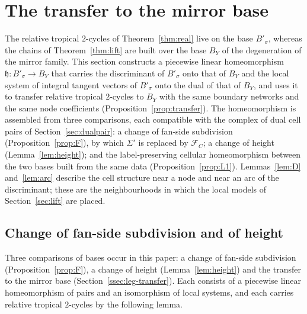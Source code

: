 \section{The transfer to the mirror base}\label{sec:legendre}

The relative tropical $2$-cycles of Theorem~\ref{thm:real} live on the base $B'_\sigma$, whereas the chains of
Theorem~\ref{thm:lift} are built over the base $B_Y$ of the degeneration of the mirror family. This section constructs a
piecewise linear homeomorphism $\mathfrak h\colon B'_\sigma\to B_Y$ that carries the discriminant of $B'_\sigma$ onto that of
$B_Y$ and the local system of integral tangent vectors of $B'_\sigma$ onto the dual of that of $B_Y$, and uses it to
transfer relative tropical $2$-cycles to $B_Y$ with the same boundary networks and the same node coefficients
(Proposition~\ref{prop:transfer}). The homeomorphism is assembled from three comparisons, each compatible with the
complex of dual cell pairs of Section~\ref{sec:dualpair}: a change of fan-side subdivision (Proposition~\ref{prop:F}), by which $\Sigma'$ is
replaced by $\mathcal F_C$; a change of height (Lemma~\ref{lem:height}); and the label-preserving cellular homeomorphism between the two bases built
from the same data (Proposition~\ref{prop:L1}). Lemmas~\ref{lem:D} and~\ref{lem:arc} describe the cell structure near a
node and near an arc of the discriminant; these are the neighbourhoods in which the local models of Section~\ref{sec:lift}
are placed.

\subsection{Change of fan-side subdivision and of height}\label{ssec:leg-F}
Three comparisons of bases occur in this paper: a change of fan-side subdivision (Proposition~\ref{prop:F}), a change of height
(Lemma~\ref{lem:height}) and the transfer to the mirror base (Section~\ref{ssec:leg-transfer}). Each consists of a
piecewise linear homeomorphism of pairs and an isomorphism of local systems, and each carries relative tropical
$2$-cycles by the following lemma.

